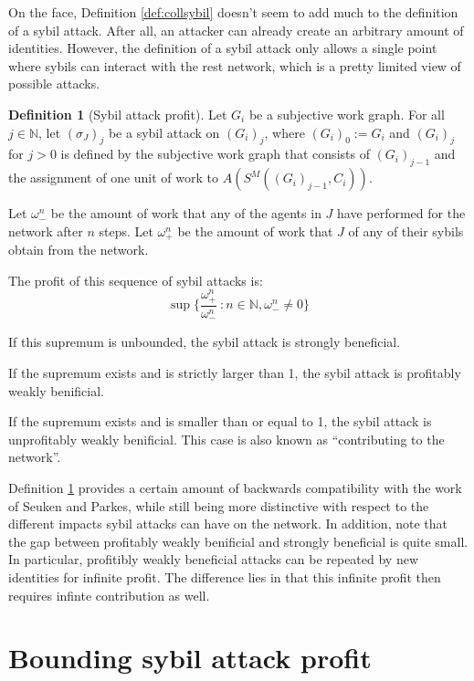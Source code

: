 \documentclass[a4paper,11pt]{book}
\newcommand{\bb}{\mathbb}
\theoremstyle{definition}
\newtheorem{definition}{Definition}
\begin{document}
On the face, Definition \ref{def:collsybil} doesn't seem to add much to the definition of a sybil attack.
After all, an attacker can already create an arbitrary amount of identities. However, the definition of a
sybil attack only allows a single point where sybils can interact with the rest network, which is a pretty limited
view of possible attacks. 

\begin{definition}[Sybil attack profit]
    Let $G_i$ be a subjective work graph. For all $j \in \bb{N}$, let $(\sigma_J)_j$ be a sybil attack
    on $(G_i)_j$, where $(G_i)_0 := G_i$ and $(G_i)_j$ for $j > 0$ is defined by the subjective
    work graph that consists of $(G_i)_{j-1}$ and the assignment of one unit of work to 
    $A(S^M( (G_i)_{j-1}, C_i))$.

    Let $\omega^n_-$ be the amount of work that any of the agents in $J$ have performed for
    the network after $n$ steps. Let $\omega^n_+$ be the amount of work that $J$ of any of their
    sybils obtain from the network.

    The profit of this sequence of sybil attacks is:
    \begin{equation*}
        \sup \{\frac{\omega^n_+}{\omega^n_-}\ : n \in \bb{N}, \omega^n_- \neq 0\}
    \end{equation*}

    If this supremum is unbounded, the sybil attack is strongly beneficial.

    If the supremum exists and is strictly larger than 1, the sybil attack is 
    profitably weakly benificial.

    If the supremum exists and is smaller than or equal to 1, the sybil attack
    is unprofitably weakly benificial. This case is also known as ``contributing to the network''.
    \label{def:sybil_profit}
\end{definition}

Definition \ref{def:sybil_profit} provides a certain amount of backwards compatibility with the work
of Seuken and Parkes, while still being more distinctive with respect to the different impacts
sybil attacks can have on the network. In addition, note that the gap between profitably weakly
benificial and strongly beneficial is quite small. In particular, profitibly weakly beneficial
attacks can be repeated by new identities for infinite profit. The difference lies in that
this infinite profit then requires infinte contribution as well.

\section{Bounding sybil attack profit}
\end{document}
